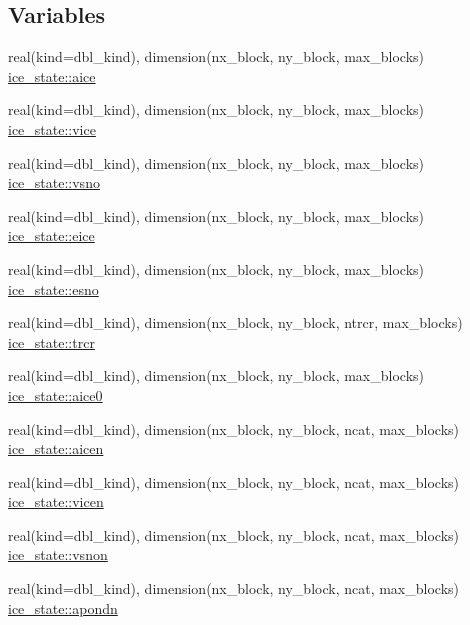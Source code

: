 \subsection*{Variables}
\begin{DoxyCompactItemize}
\item 
real(kind=dbl\_\-kind), dimension(nx\_\-block, ny\_\-block, max\_\-blocks) \hyperlink{namespaceice__state_a91eaa8dd8287c9640310a0aec0a85df8}{ice\_\-state::aice}
\item 
real(kind=dbl\_\-kind), dimension(nx\_\-block, ny\_\-block, max\_\-blocks) \hyperlink{namespaceice__state_a097435b3544c01705ca626cc43ee61b5}{ice\_\-state::vice}
\item 
real(kind=dbl\_\-kind), dimension(nx\_\-block, ny\_\-block, max\_\-blocks) \hyperlink{namespaceice__state_ac2427022070069eb40ad5d21ad7a684e}{ice\_\-state::vsno}
\item 
real(kind=dbl\_\-kind), dimension(nx\_\-block, ny\_\-block, max\_\-blocks) \hyperlink{namespaceice__state_aa30edd78b7a6855c7bfabf428b93f355}{ice\_\-state::eice}
\item 
real(kind=dbl\_\-kind), dimension(nx\_\-block, ny\_\-block, max\_\-blocks) \hyperlink{namespaceice__state_af4c38f6f98fdc5516cde3066120a0074}{ice\_\-state::esno}
\item 
real(kind=dbl\_\-kind), dimension(nx\_\-block, ny\_\-block, ntrcr, max\_\-blocks) \hyperlink{namespaceice__state_ad9117b5d7f02ca8a6a10db8afa75a6ef}{ice\_\-state::trcr}
\item 
real(kind=dbl\_\-kind), dimension(nx\_\-block, ny\_\-block, max\_\-blocks) \hyperlink{namespaceice__state_aabb208bcf122d73e3975ab376d190703}{ice\_\-state::aice0}
\item 
real(kind=dbl\_\-kind), dimension(nx\_\-block, ny\_\-block, ncat, max\_\-blocks) \hyperlink{namespaceice__state_a38df7a3870d9a3a425b31808503ba98e}{ice\_\-state::aicen}
\item 
real(kind=dbl\_\-kind), dimension(nx\_\-block, ny\_\-block, ncat, max\_\-blocks) \hyperlink{namespaceice__state_aa85616e03769af4afb0166070aa7cc8f}{ice\_\-state::vicen}
\item 
real(kind=dbl\_\-kind), dimension(nx\_\-block, ny\_\-block, ncat, max\_\-blocks) \hyperlink{namespaceice__state_acd313a058964928092cbc75f7689cef5}{ice\_\-state::vsnon}
\item 
real(kind=dbl\_\-kind), dimension(nx\_\-block, ny\_\-block, ncat, max\_\-blocks) \hyperlink{namespaceice__state_aa2d9beee38aa0717dea2399d060d236d}{ice\_\-state::apondn}
\item 

\end{DoxyCompactItemize}
